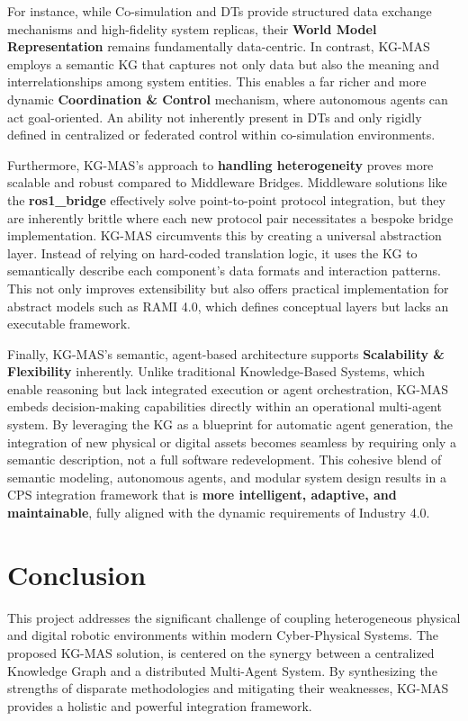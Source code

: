 \documentclass{article} %
\begin{document}
For instance, while Co-simulation and DTs provide structured data exchange mechanisms and high-fidelity system replicas, their \textbf{World Model Representation} remains fundamentally data-centric. In contrast, KG-MAS employs a semantic KG that captures not only data but also the meaning and interrelationships among system entities. This enables a far richer and more dynamic \textbf{Coordination \& Control} mechanism, where autonomous agents can act goal-oriented. An ability not inherently present in DTs and only rigidly defined in centralized or federated control within co-simulation environments.

Furthermore, KG-MAS's approach to \textbf{handling heterogeneity} proves more scalable and robust compared to Middleware Bridges. Middleware solutions like the \textbf{ros1\_bridge }effectively solve point-to-point protocol integration, but they are inherently brittle where each new protocol pair necessitates a bespoke bridge implementation. KG-MAS circumvents this by creating a universal abstraction layer. Instead of relying on hard-coded translation logic, it uses the KG to semantically describe each component’s data formats and interaction patterns. This not only improves extensibility but also offers practical implementation for abstract models such as RAMI 4.0, which defines conceptual layers but lacks an executable framework.

Finally, KG-MAS’s semantic, agent-based architecture supports \textbf{Scalability \& Flexibility} inherently. Unlike traditional Knowledge-Based Systems, which enable reasoning but lack integrated execution or agent orchestration, KG-MAS embeds decision-making capabilities directly within an operational multi-agent system. By leveraging the KG as a blueprint for automatic agent generation, the integration of new physical or digital assets becomes seamless by requiring only a semantic description, not a full software redevelopment. This cohesive blend of semantic modeling, autonomous agents, and modular system design results in a CPS integration framework that is \textbf{more intelligent, adaptive, and maintainable}, fully aligned with the dynamic requirements of Industry 4.0.
\newpage
\section{Conclusion}
This project addresses the significant challenge of coupling heterogeneous physical and digital robotic environments within modern Cyber-Physical Systems. The proposed KG-MAS solution, is centered on the synergy between a centralized Knowledge Graph and a distributed Multi-Agent System. By synthesizing the strengths of disparate methodologies and mitigating their weaknesses, KG-MAS provides a holistic and powerful integration framework.
\end{document}
